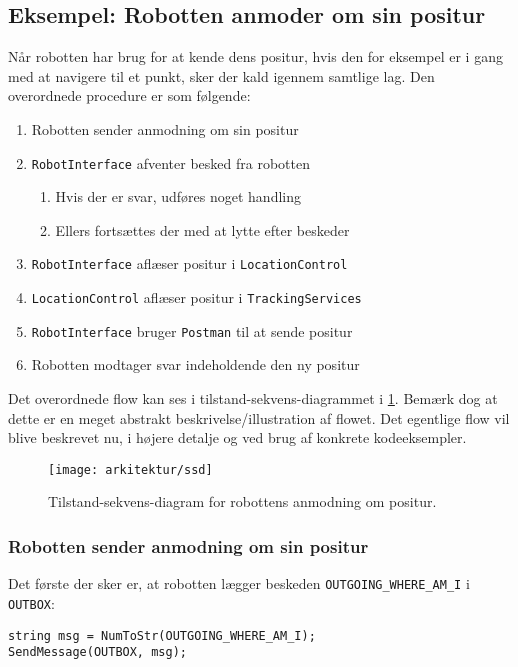\subsection{Eksempel: Robotten anmoder om sin positur}
Når robotten har brug for at kende dens positur, hvis den for eksempel er i gang med at navigere til et punkt, sker der kald igennem samtlige lag.
Den overordnede procedure er som følgende:
\begin{enumerate}
\item{Robotten sender anmodning om sin positur}
\item{\lstinline[style=csharp]!RobotInterface! afventer besked fra robotten}
\begin{enumerate}
\item{Hvis der er svar, udføres noget handling}
\item{Ellers fortsættes der med at lytte efter beskeder}
\end{enumerate}
\item{\lstinline[style=csharp]!RobotInterface! aflæser positur i \lstinline[style=csharp]!LocationControl!}
\item{\lstinline[style=csharp]!LocationControl! aflæser positur i \lstinline[style=csharp]!TrackingServices!}
\item{\lstinline[style=csharp]!RobotInterface! bruger \lstinline[style=csharp]!Postman! til at sende positur}
\item{Robotten modtager svar indeholdende den ny positur}
\end{enumerate}
Det overordnede flow kan ses i tilstand-sekvens-diagrammet i \cref{flow:ssd}.
Bemærk dog at dette er en meget abstrakt beskrivelse/illustration af flowet.
Det egentlige flow vil blive beskrevet nu, i højere detalje og ved brug af konkrete kodeeksempler.

\begin{figure}[H]
\centering
\texttt{[image: arkitektur/ssd]}
\caption{Tilstand-sekvens-diagram for robottens anmodning om positur.}
\label{flow:ssd}
\end{figure}

\subsubsection{Robotten sender anmodning om sin positur}
Det første der sker er, at robotten lægger beskeden \lstinline[style=c]!OUTGOING_WHERE_AM_I! i \lstinline[style=c]!OUTBOX!:

\begin{lstlisting}[style=csmall,label=lst:whereami_request,caption=Robotten sender anmodning om positur.]
string msg = NumToStr(OUTGOING_WHERE_AM_I);
SendMessage(OUTBOX, msg);
\end{lstlisting}

